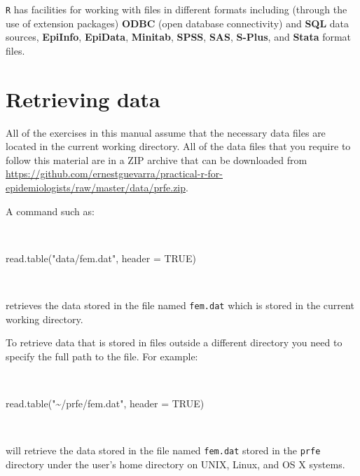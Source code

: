\documentclass[
  12pt,
  a4paper]{book}
\newenvironment{Shaded}{\begin{snugshade}}{\end{snugshade}}
\newcommand{\AttributeTok}[1]{\textcolor[rgb]{0.77,0.63,0.00}{#1}}
\newcommand{\ConstantTok}[1]{\textcolor[rgb]{0.00,0.00,0.00}{#1}}
\newcommand{\FunctionTok}[1]{\textcolor[rgb]{0.00,0.00,0.00}{#1}}
\newcommand{\NormalTok}[1]{#1}
\newcommand{\StringTok}[1]{\textcolor[rgb]{0.31,0.60,0.02}{#1}}
\begin{document}
\texttt{R} has facilities for working with files in different formats including (through the use of extension packages) \textbf{ODBC} (open database connectivity) and \textbf{SQL} data sources, \textbf{EpiInfo}, \textbf{EpiData}, \textbf{Minitab}, \textbf{SPSS}, \textbf{SAS}, \textbf{S-Plus}, and \textbf{Stata} format files.

\newpage

\hypertarget{retrieving-data}{%
\section*{Retrieving data}\label{retrieving-data}}

All of the exercises in this manual assume that the necessary data files are located in the current working directory.
All of the data files that you require to follow this material are in a ZIP archive that can be downloaded from \url{https://github.com/ernestguevarra/practical-r-for-epidemiologists/raw/master/data/prfe.zip}.

A command such as:

~

\begin{Shaded}
\begin{Highlighting}[]
\FunctionTok{read.table}\NormalTok{(}\StringTok{"data/fem.dat"}\NormalTok{, }\AttributeTok{header =} \ConstantTok{TRUE}\NormalTok{)}
\end{Highlighting}
\end{Shaded}

~

retrieves the data stored in the file named \texttt{fem.dat} which is stored in the current working directory.

To retrieve data that is stored in files outside a different directory you need to specify the full path to the file. For example:

~

\begin{Shaded}
\begin{Highlighting}[]
\FunctionTok{read.table}\NormalTok{(}\StringTok{"\textasciitilde{}/prfe/fem.dat"}\NormalTok{, }\AttributeTok{header =} \ConstantTok{TRUE}\NormalTok{)}
\end{Highlighting}
\end{Shaded}

~

will retrieve the data stored in the file named \texttt{fem.dat} stored in the \texttt{prfe} directory under the user's home directory on UNIX, Linux, and OS X systems.
\end{document}
